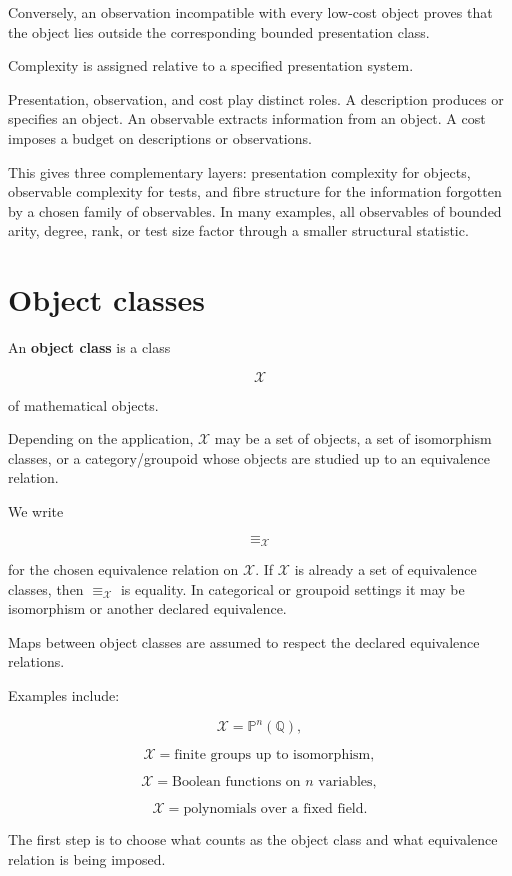 \documentclass[11pt]{article}
\begin{document}
Conversely, an observation incompatible with every low-cost object proves that the object lies outside the corresponding bounded presentation class.

Complexity is assigned relative to a specified presentation system.

Presentation, observation, and cost play distinct roles. A description produces or specifies an object. An observable extracts information from an object. A cost imposes a budget on descriptions or observations.

This gives three complementary layers: presentation complexity for objects, observable complexity for tests, and fibre structure for the information forgotten by a chosen family of observables. In many examples, all observables of bounded arity, degree, rank, or test size factor through a smaller structural statistic.


\section{Object classes}

An \textbf{object class} is a class

\[
\mathcal X
\]

of mathematical objects.

Depending on the application, \(\mathcal X\) may be a set of objects, a set of isomorphism classes, or a category/groupoid whose objects are studied up to an equivalence relation.

We write

\[
\equiv_\mathcal X
\]

for the chosen equivalence relation on \(\mathcal X\). If \(\mathcal X\) is already a set of equivalence classes, then \(\equiv_\mathcal X\) is equality. In categorical or groupoid settings it may be isomorphism or another declared equivalence.

Maps between object classes are assumed to respect the declared equivalence relations.

Examples include:

\[
\mathcal X=\mathbb P^n(\mathbb Q),
\]

\[
\mathcal X={\text{finite groups up to isomorphism}},
\]

\[
\mathcal X={\text{Boolean functions on }n\text{ variables}},
\]

\[
\mathcal X={\text{polynomials over a fixed field}}.
\]

The first step is to choose what counts as the object class and what equivalence relation is being imposed.
\end{document}
